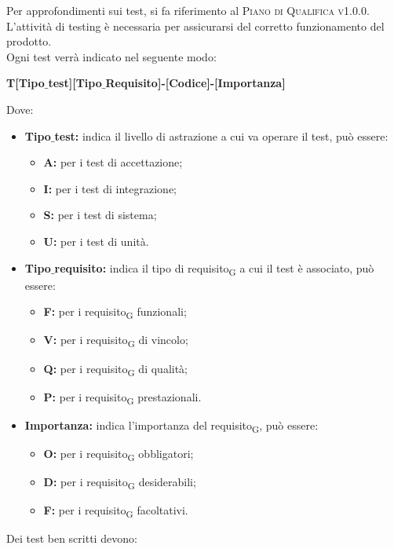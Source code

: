     Per approfondimenti sui test, si fa riferimento al \textsc{Piano di Qualifica v1.0.0}.
    L'attività di testing è necessaria per assicurarsi del corretto funzionamento del prodotto.\\Ogni test verrà indicato nel seguente modo:\\
    \begin{center}
    	\textbf{T[Tipo$\_$test][Tipo$\_$Requisito]-[Codice]-[Importanza]}
    \end{center}
    Dove:
    \begin{itemize}
    	\item \textbf{Tipo$\_$test:} indica il livello di astrazione a cui va operare il test, può essere:
    	\begin{itemize}
    		\item \textbf{A:} per i test di accettazione;
    		\item \textbf{I:} per i test di integrazione;
    		\item \textbf{S:} per i test di sistema;
    		\item \textbf{U:} per i test di unità.
    	\end{itemize}
    	\item \textbf{Tipo$\_$requisito:} indica il tipo di requisito\textsubscript{G} a cui il test è associato, può essere:
    	\begin{itemize}
    		\item \textbf{F:} per i requisito\textsubscript{G} funzionali;
    		\item \textbf{V:} per i requisito\textsubscript{G} di vincolo;
    		\item \textbf{Q:} per i requisito\textsubscript{G} di qualità;
    		\item \textbf{P:} per i requisito\textsubscript{G} prestazionali.
    	\end{itemize}
    	\item \textbf{Importanza:} indica l'importanza del requisito\textsubscript{G}, può essere:
    	\begin{itemize}
    		\item \textbf{O:} per i requisito\textsubscript{G} obbligatori;
    		\item \textbf{D:} per i requisito\textsubscript{G} desiderabili;
    		\item \textbf{F:} per i requisito\textsubscript{G} facoltativi.
    	\end{itemize}
    \end{itemize}
    Dei test ben scritti devono:
